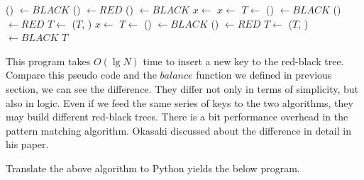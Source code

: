 \documentclass{article}
\begin{document}
\begin{algorithmic}[1]
      \State {}() $\gets BLACK$
      \State {}() $\gets RED$
      \State {}() $\gets BLACK$
      \State $x \gets$ 
    \Else
          \State $x \gets$ 
          \State $T \gets$ 
        \EndIf
        \State {}() $\gets BLACK$
        \State {}() $\gets RED$
        \State $T \gets$ ($T$, )
      \Else
          \State $x \gets$ 
          \State $T \gets$ 
        \EndIf
        \State {}() $\gets BLACK$
        \State {}() $\gets RED$
        \State $T \gets$ ($T$, )
      \EndIf
    \EndIf
  \EndWhile
  \State {} $\gets BLACK$
  \State \Return $T$
\EndFunction
\end{algorithmic}

This program takes $O(\lg N)$ time to insert a new key to the red-black tree.
Compare this pseudo code and the $balance$ function we defined in previous
section, we can see the difference. They differ not only in terms of
simplicity, but also in logic. Even if we feed the same series of keys to 
the two algorithms, they may build different red-black trees. There 
is a bit performance overhead in the pattern matching algorithm. 
Okasaki discussed about the difference in detail in his paper\cite{okasaki}. 

Translate the above algorithm to Python yields the below program.
\end{document}
